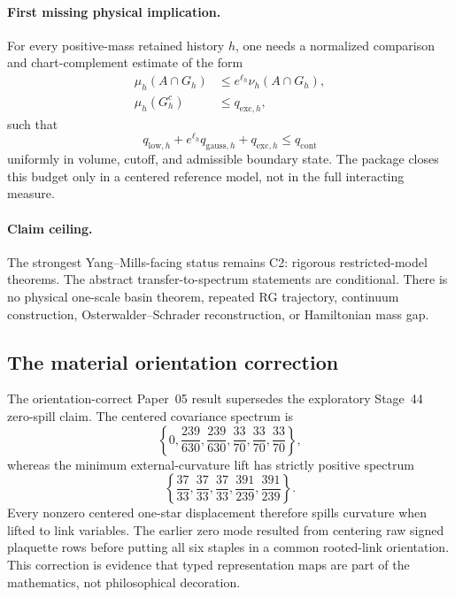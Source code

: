 \paragraph{First missing physical implication.}
For every positive-mass retained history \(h\), one needs a normalized
comparison and chart-complement estimate of the form
\begin{align}
 \mu_h(A\cap G_h)&\le e^{\ell_h}\nu_h(A\cap G_h),\\
 \mu_h(G_h^c)&\le q_{\mathrm{exc},h},
\end{align}
such that
\begin{equation}
q_{\mathrm{low},h}+e^{\ell_h}q_{\mathrm{gauss},h}
+q_{\mathrm{exc},h}\le q_{\mathrm{cont}}
\end{equation}
uniformly in volume, cutoff, and admissible boundary state.  The package
closes this budget only in a centered reference model, not in the full
interacting measure.

\paragraph{Claim ceiling.}
The strongest Yang--Mills-facing status remains C2: rigorous restricted-model
theorems.  The abstract transfer-to-spectrum statements are conditional.
There is no physical one-scale basin theorem, repeated RG trajectory,
continuum construction, Osterwalder--Schrader reconstruction, or Hamiltonian
mass gap.

\subsection{The material orientation correction}

The orientation-correct Paper~05 result supersedes the exploratory Stage~44
zero-spill claim.  The centered covariance spectrum is
\begin{equation}
 \left\{0,\frac{239}{630},\frac{239}{630},
 \frac{33}{70},\frac{33}{70},\frac{33}{70}\right\},
\end{equation}
whereas the minimum external-curvature lift has strictly positive spectrum
\begin{equation}
 \left\{\frac{37}{33},\frac{37}{33},\frac{37}{33},
 \frac{391}{239},\frac{391}{239}\right\}.
\end{equation}
Every nonzero centered one-star displacement therefore spills curvature when
lifted to link variables.  The earlier zero mode resulted from centering raw
signed plaquette rows before putting all six staples in a common rooted-link
orientation.  This correction is evidence that typed representation maps are
part of the mathematics, not philosophical decoration.
